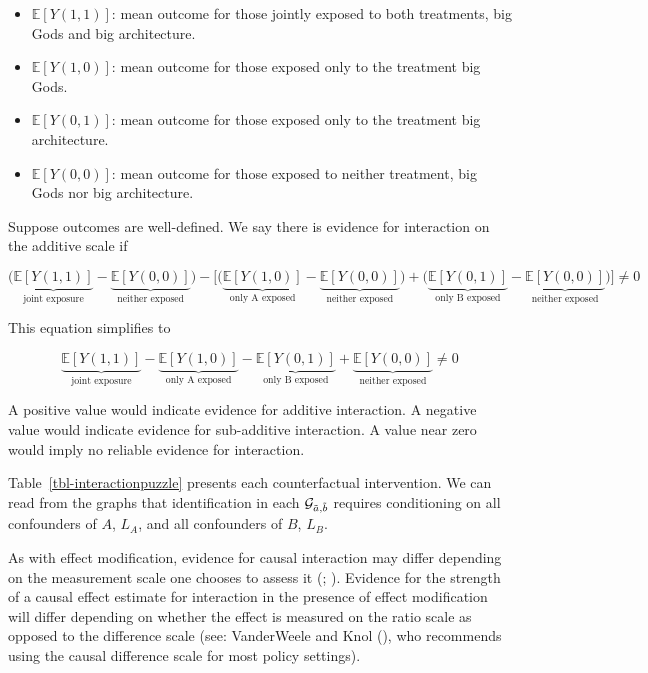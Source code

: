 \documentclass[
  single column]{article}
\providecommand{\tightlist}{%
  \setlength{\itemsep}{0pt}\setlength{\parskip}{0pt}}\usepackage{longtable,booktabs,array}
\begin{document}
\begin{itemize}
\tightlist
\item
  \(\mathbb{E}[Y(1,1)]\): mean outcome for those jointly exposed to both
  treatments, big Gods and big architecture.
\item
  \(\mathbb{E}[Y(1,0)]\): mean outcome for those exposed only to the
  treatment big Gods.
\item
  \(\mathbb{E}[Y(0,1)]\): mean outcome for those exposed only to the
  treatment big architecture.
\item
  \(\mathbb{E}[Y(0,0)]\): mean outcome for those exposed to neither
  treatment, big Gods nor big architecture.
\end{itemize}

Suppose outcomes are well-defined. We say there is evidence for
interaction on the additive scale if

\[
\bigg(\underbrace{\mathbb{E}[Y(1,1)]}_{\text{joint exposure}} - \underbrace{\mathbb{E}[Y(0,0)]}_{\text{neither exposed}}\bigg) - \bigg[ \bigg(\underbrace{\mathbb{E}[Y(1,0)]}_{\text{only A exposed}} - \underbrace{\mathbb{E}[Y(0,0)]}_{\text{neither exposed}}\bigg) + \bigg(\underbrace{\mathbb{E}[Y(0,1)]}_{\text{only B exposed}} - \underbrace{\mathbb{E}[Y(0,0)]}_{\text{neither exposed}} \bigg)\bigg] \neq 0 
\]

This equation simplifies to

\[ 
\underbrace{\mathbb{E}[Y(1,1)]}_{\text{joint exposure}} - \underbrace{\mathbb{E}[Y(1,0)]}_{\text{only A exposed}} - \underbrace{\mathbb{E}[Y(0,1)]}_{\text{only B exposed}} + \underbrace{\mathbb{E}[Y(0,0)]}_{\text{neither exposed}} \neq 0 
\]

A positive value would indicate evidence for additive interaction. A
negative value would indicate evidence for sub-additive interaction. A
value near zero would imply no reliable evidence for interaction.

Table~\ref{tbl-interactionpuzzle} presents each counterfactual
intervention. We can read from the graphs that identification in each
\(\mathcal{G}_{\Tilde{a}, \Tilde{b}}\) requires conditioning on all
confounders of \(A\), \(L_A\), and all confounders of \(B\), \(L_B\).

As with effect modification, evidence for causal interaction may differ
depending on the measurement scale one chooses to assess it
(;
). Evidence for
the strength of a causal effect estimate for interaction in the presence
of effect modification will differ depending on whether the effect is
measured on the ratio scale as opposed to the difference scale (see:
VanderWeele and Knol (), who
recommends using the causal difference scale for most policy settings).
\end{document}
